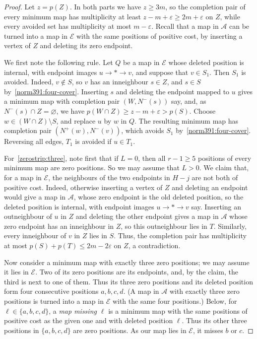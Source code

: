 \begin{proof}
Let $z=p(Z)$. In both parts we have $z\ge3m$, so the completion pair of every minimum map has multiplicity at least $z-m+\varepsilon\ge 2m+\varepsilon$ on $Z$, while every avoided set has multiplicity at most $m-\varepsilon$.
Recall that a map in $\mathcal A$ can be turned into a map in $\mathcal E$ with the same positions of positive cost, by inserting a vertex of $Z$ and deleting its zero endpoint.

We first note the following rule. Let $Q$ be a map in $\mathcal E$ whose deleted position is internal, with endpoint images $u\to*\to v$, and suppose that $v\in S_1$. Then $S_1$ is avoided. Indeed, $v\notin S$, so $v$ has an inneighbour $s\in Z$, and $s\in S$ by~\eqref{norm391:four-cover}. Inserting $s$ and deleting the endpoint mapped to $u$ gives a minimum map with completion pair $(W,N^-(s))$ say, and, as $N^-(s)\cap Z=\varnothing$, we have $p(W\cap Z)\ge z-m+\varepsilon>p(S)$. Choose $w\in(W\cap Z)\setminus S$, and replace $u$ by $w$ in $Q$. The resulting minimum map has completion pair $(N^+(w),N^-(v))$, which avoids $S_1$ by~\eqref{norm391:four-cover}. Reversing all edges, $T_1$ is avoided if $u\in T_1$.

For~\ref{zerostrip:three}, note first that if $L=0$, then all $r-1\ge5$ positions of every minimum map are zero positions. So we may assume that $L>0$.
We claim that, for a map in $\mathcal E$, the neighbours of the two endpoints in $H-j$ are not both of positive cost. Indeed, otherwise inserting a vertex of $Z$ and deleting an endpoint would give a map in $\mathcal A$, whose zero endpoint is the old deleted position, so the deleted position is internal, with endpoint images $u\to *\to v$ say. Inserting an outneighbour of $u$ in $Z$ and deleting the other endpoint gives a map in $\mathcal A$ whose zero endpoint has an inneighbour in $Z$, so this outneighbour lies in $T$. Similarly, every inneighbour of $v$ in $Z$ lies in $S$. Thus, the completion pair has multiplicity at most $p(S)+p(T)\le2m-2\varepsilon$ on $Z$, a contradiction.

Now consider a minimum map with exactly three zero positions; we may assume it lies in $\mathcal E$. Two of its zero positions are its endpoints, and, by the claim, the third is next to one of them. Thus its three zero positions and its deleted position form four consecutive positions $a,b,c,d$. (A map in $\mathcal A$ with exactly three zero positions is turned into a map in $\mathcal E$ with the same four positions.)
Below, for $\ell\in\{a,b,c,d\}$, a \emph{map missing $\ell$} is a minimum map with the same positions of positive cost as the given one and with deleted position $\ell$. Thus its other three positions in $\{a,b,c,d\}$ are zero positions.
As our map lies in $\mathcal E$, it misses $b$ or $c$.


\end{proof}
